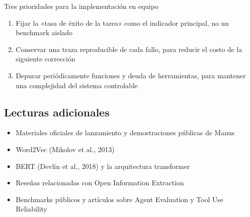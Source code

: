 \documentclass[a4paper]{article}
\begin{document}
\begin{importantbox}{Tres prioridades para la implementación en equipo}
\begin{enumerate}
    \item Fijar la «tasa de éxito de la tarea» como el indicador principal, no un benchmark aislado
    \item Conservar una traza reproducible de cada fallo, para reducir el costo de la siguiente corrección
    \item Depurar periódicamente funciones y deuda de herramientas, para mantener una complejidad del sistema controlable
\end{enumerate}
\end{importantbox}

\subsection{Lecturas adicionales}

\begin{itemize}
    \item Materiales oficiales de lanzamiento y demostraciones públicas de Manus
    \item Word2Vec (Mikolov et al., 2013)
    \item BERT (Devlin et al., 2018) y la arquitectura transformer
    \item Reseñas relacionadas con Open Information Extraction
    \item Benchmarks públicos y artículos sobre Agent Evaluation y Tool Use Reliability
\end{itemize}

\end{document}
